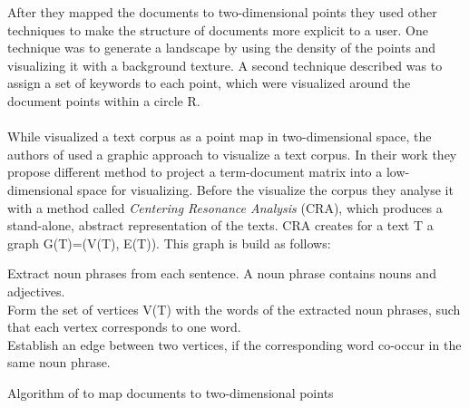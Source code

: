 After they mapped the documents to two-dimensional points they used other techniques to make the structure of documents more explicit to a user. One technique was to generate a landscape by using the density of the points and visualizing it with a  background texture. A second technique described was to assign a set of keywords to each point, which were visualized around the document points within a circle R. \\
~\\


While \cite{journals/informaticaSI/FortunaGM05} visualized a text corpus as a point map in two-dimensional space,  the authors of \cite{doi:10.1117/12.647867} used a graphic approach to visualize a text corpus. In their work they propose different method to project a term-document matrix into a low-dimensional space for visualizing. Before the visualize the corpus they analyse it with a method called \textit{Centering Resonance Analysis} (CRA), which produces a stand-alone, abstract representation of the texts. CRA creates for a text T a graph G(T)=(V(T), E(T)). This graph is build as follows:
\begin{algorithm}
	
	     Extract noun phrases from each sentence. A noun phrase contains nouns and adjectives.  \\
		 Form the set of vertices V(T) with the words of the extracted noun phrases, such that each vertex corresponds to one word. \\ 
		 Establish an edge between two vertices, if the corresponding word co-occur in the same noun phrase.
	
	\caption{Algorithm of \cite{journals/informaticaSI/FortunaGM05} to map documents to two-dimensional points}
\end{algorithm}


